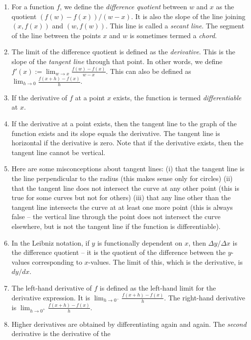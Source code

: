\documentclass[10pt]{amsart}
\begin{document}
\begin{enumerate}
\item For a function $f$, we define the {\em difference quotient}
  between $w$ and $x$ as the quotient $(f(w) - f(x))/(w - x)$. It is
  also the slope of the line joining $(x,f(x))$ and $(w,f(w))$. This
  line is called a {\em secant line}. The segment of the line between the
  points $x$ and $w$ is sometimes termed a {\em chord}.
\item The limit of the difference quotient is defined as the {\em
  derivative}. This is the slope of the {\em tangent line} through
  that point. In other words, we define $f'(x) := \lim_{w \to x}
  \frac{f(w) - f(x)}{w - x}$. This can also be defined as $\lim_{h \to
  0} \frac{f(x + h) - f(x)}{h}$.
\item If the derivative of $f$ at a point $x$ exists, the function is
  termed {\em differentiable} at $x$.
\item If the derivative at a point exists, then the tangent line to
  the graph of the function exists and its slope equals the
  derivative. The tangent line is horizontal if the derivative is
  zero. Note that if the derivative exists, then the tangent line
  cannot be vertical.
\item Here are some misconceptions about tangent lines: (i) that the
  tangent line is the line perpendicular to the radius (this makes
  sense only for circles) (ii) that the tangent line does not
  intersect the curve at any other point (this is true for some curves
  but not for others) (iii) that any line other than the tangent line
  intersects the curve at at least one more point (this is always
  false -- the vertical line through the point does not intersect the
  curve elsewhere, but is not the tangent line if the function is
  differentiable).
\item In the Leibniz notation, if $y$ is functionally dependent on
  $x$, then $\Delta y/\Delta x$ is the difference quotient -- it is
  the quotient of the difference between the $y$-values corresponding
  to $x$-values. The limit of this, which is the derivative, is
  $dy/dx$.
\item The left-hand derivative of $f$ is defined as the left-hand
  limit for the derivative expression. It is $\lim_{h \to 0^-}
  \frac{f(x + h) - f(x)}{h}$. The right-hand derivative is $\lim_{h
  \to 0^+} \frac{f(x + h) - f(x)}{h}$.
\item Higher derivatives are obtained by differentiating again and
  again. The {\em second} derivative is the derivative of the

\end{enumerate}
\end{document}
